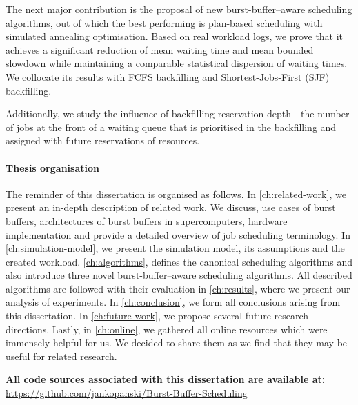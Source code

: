 \documentclass[thesis-en.tex]{subfiles}
\begin{document}
The next major contribution is the proposal of new burst-buffer--aware scheduling algorithms, out of which the best performing is plan-based scheduling with simulated annealing optimisation. Based on real workload logs, we prove that it achieves a significant reduction of mean waiting time and mean bounded slowdown while maintaining a comparable statistical dispersion of waiting times. We collocate its results with FCFS backfilling and Shortest-Jobs-First (SJF) backfilling.

Additionally, we study the influence of backfilling reservation depth - the number of jobs at the front of a waiting queue that is prioritised in the backfilling and assigned with future reservations of resources.

\paragraph{Thesis organisation}
The reminder of this dissertation is organised as follows. In \autoref{ch:related-work}, we present an in-depth description of related work. We discuss, use cases of burst buffers, architectures of burst buffers in supercomputers, hardware implementation and provide a detailed overview of job scheduling terminology. In \autoref{ch:simulation-model}, we present the simulation model, its assumptions and the created workload. \autoref{ch:algorithms}, defines the canonical scheduling algorithms and also introduce three novel burst-buffer--aware scheduling algorithms. All described algorithms are followed with their evaluation in \autoref{ch:results}, where we present our analysis of experiments. In \autoref{ch:conclusion}, we form all conclusions arising from this dissertation. In \autoref{ch:future-work}, we propose several future research directions. Lastly, in \autoref{ch:online}, we gathered all online resources which were immensely helpful for us. We decided to share them as we find that they may be useful for related research.

\bigskip

\noindent
\textbf{All code sources associated with this dissertation are available at:}\\ \url{https://github.com/jankopanski/Burst-Buffer-Scheduling}
\end{document}
